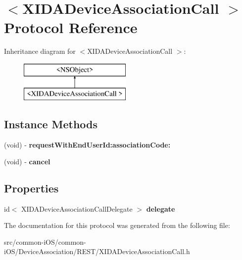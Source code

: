 \hypertarget{protocol_x_i_d_a_device_association_call_01-p}{}\section{$<$X\+I\+D\+A\+Device\+Association\+Call $>$ Protocol Reference}
\label{protocol_x_i_d_a_device_association_call_01-p}
Inheritance diagram for $<$X\+I\+D\+A\+Device\+Association\+Call $>$\+:\begin{figure}[H]
\begin{center}
\leavevmode
\includegraphics[height=2.000000cm]{protocol_x_i_d_a_device_association_call_01-p}
\end{center}
\end{figure}
\subsection*{Instance Methods}
\begin{DoxyCompactItemize}
\item 
\hypertarget{protocol_x_i_d_a_device_association_call_01-p_a4d8f1752ccc6810dba49688f5a3016ea}{}\label{protocol_x_i_d_a_device_association_call_01-p_a4d8f1752ccc6810dba49688f5a3016ea} 
(void) -\/ {\bfseries request\+With\+End\+User\+Id\+:association\+Code\+:}
\item 
\hypertarget{protocol_x_i_d_a_device_association_call_01-p_a15944c0406f88d86587b605bca52cd72}{}\label{protocol_x_i_d_a_device_association_call_01-p_a15944c0406f88d86587b605bca52cd72} 
(void) -\/ {\bfseries cancel}
\end{DoxyCompactItemize}
\subsection*{Properties}
\begin{DoxyCompactItemize}
\item 
\hypertarget{protocol_x_i_d_a_device_association_call_01-p_a30d52e90f545745ed5e9002d84e3cd86}{}\label{protocol_x_i_d_a_device_association_call_01-p_a30d52e90f545745ed5e9002d84e3cd86} 
id$<$ X\+I\+D\+A\+Device\+Association\+Call\+Delegate $>$ {\bfseries delegate}
\end{DoxyCompactItemize}


The documentation for this protocol was generated from the following file\+:\begin{DoxyCompactItemize}
\item 
src/common-\/i\+O\+S/common-\/i\+O\+S/\+Device\+Association/\+R\+E\+S\+T/X\+I\+D\+A\+Device\+Association\+Call.\+h\end{DoxyCompactItemize}

